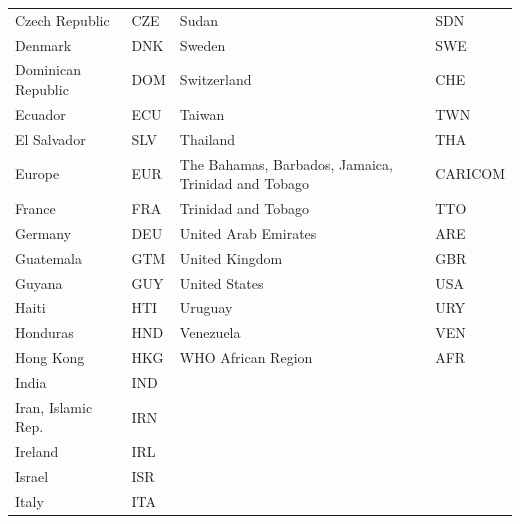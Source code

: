 {\begin{tabularx}{\linewidth}{Z Y Z Y}
Czech Republic          & CZE          & Sudan                                               & SDN          \\
Denmark                 & DNK          & Sweden                                              & SWE          \\
Dominican Republic      & DOM          & Switzerland                                         & CHE          \\
Ecuador                 & ECU          & Taiwan                                              & TWN          \\
El Salvador             & SLV          & Thailand                                            & THA          \\
Europe                  & EUR          & The Bahamas, Barbados, Jamaica, Trinidad and Tobago & CARICOM      \\
France                  & FRA          & Trinidad and Tobago                                 & TTO          \\
Germany                 & DEU          & United Arab Emirates                                & ARE          \\
Guatemala               & GTM          & United Kingdom                                      & GBR          \\
Guyana                  & GUY          & United States                                       & USA          \\
Haiti                   & HTI          & Uruguay                                             & URY          \\
Honduras                & HND          & Venezuela                                           & VEN          \\
Hong Kong               & HKG          & WHO African Region                                  & AFR          \\
India                   & IND          &                                                     &              \\
Iran, Islamic Rep.      & IRN          &                                                     &              \\
Ireland                 & IRL          &                                                     &              \\
Israel                  & ISR          &                                                     &              \\
Italy                   & ITA          &                                                     &              \\ \bottomrule
\end{tabularx}
}




